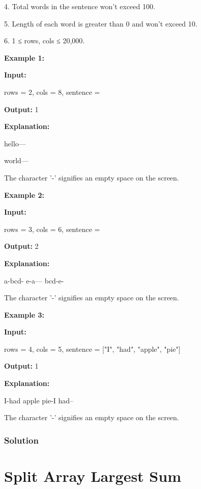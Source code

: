 4. Total words in the sentence won't exceed 100.

5. Length of each word is greater than 0 and won't exceed 10.

6. 1 ≤ rows, cols ≤ 20,000.

\textbf{Example 1:}

\textbf{Input:}

rows = 2, cols = 8, sentence = 

\textbf{Output:}
1

\textbf{Explanation:}

hello---

world---

The character '-' signifies an empty space on the screen.

\textbf{Example 2:}

\textbf{Input:}

rows = 3, cols = 6, sentence = \code{["a", "bcd", "e"]}

\textbf{Output:}
2

\textbf{Explanation:}
\begin{Code}
a-bcd-
e-a---
bcd-e-
\end{Code}

The character '-' signifies an empty space on the screen.

\textbf{Example 3:}

\textbf{Input:}

rows = 4, cols = 5, sentence = ["I", "had", "apple", "pie"]

\textbf{Output:}
1

\textbf{Explanation:}
\begin{Code}
I-had
apple
pie-I
had--
\end{Code}

The character '-' signifies an empty space on the screen.

\newpage

\subsubsection{Solution}

\begin{Code}

\end{Code}

\newpage

\section{Split Array Largest Sum} %

